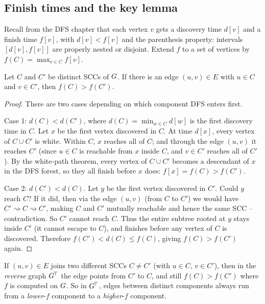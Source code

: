 \subsection{Finish times and the key lemma}

Recall from the DFS chapter that each vertex $v$ gets a discovery time $d[v]$ and a finish time $f[v]$, with $d[v]<f[v]$ and the parenthesis property: intervals $[d[v],f[v]]$ are properly nested or disjoint. Extend $f$ to a set of vertices by $f(C)=\max_{v\in C} f[v]$.

\begin{lemma}
\label{ch05:lem-finish}
Let $C$ and $C'$ be distinct SCCs of $G$. If there is an edge $(u,v)\in E$ with $u\in C$ and $v\in C'$, then $f(C) > f(C')$.
\end{lemma}

\begin{proof}
There are two cases depending on which component DFS enters first.

Case 1: $d(C) < d(C')$, where $d(C)=\min_{w\in C} d[w]$ is the first discovery time in $C$. Let $x$ be the first vertex discovered in $C$. At time $d[x]$, every vertex of $C\cup C'$ is white. Within $C$, $x$ reaches all of $C$; and through the edge $(u,v)$ it reaches $C'$ (since $u\in C$ is reachable from $x$ inside $C$, and $v\in C'$ reaches all of $C'$). By the white-path theorem, every vertex of $C\cup C'$ becomes a descendant of $x$ in the DFS forest, so they all finish before $x$ does: $f[x] = f(C) > f(C')$.

Case 2: $d(C') < d(C)$. Let $y$ be the first vertex discovered in $C'$. Could $y$ reach $C$? If it did, then via the edge $(u,v)$ (from $C$ to $C'$) we would have $C'\rightsquigarrow C\rightsquigarrow C'$, making $C$ and $C'$ mutually reachable and hence the same SCC -- contradiction. So $C'$ cannot reach $C$. Thus the entire subtree rooted at $y$ stays inside $C'$ (it cannot escape to $C$), and finishes before any vertex of $C$ is discovered. Therefore $f(C') < d(C) \le f(C)$, giving $f(C) > f(C')$ again.
\end{proof}

\begin{corollary}
\label{ch05:cor-edge}
If $(u,v)\in E$ joins two different SCCs $C\ne C'$ (with $u\in C$, $v\in C'$), then in the \emph{reverse} graph $G^{\!\top}$ the edge points from $C'$ to $C$, and still $f(C)>f(C')$ where $f$ is computed on $G$. So in $G^{\!\top}$, edges between distinct components always run from a \emph{lower}-$f$ component to a \emph{higher}-$f$ component.
\end{corollary}


